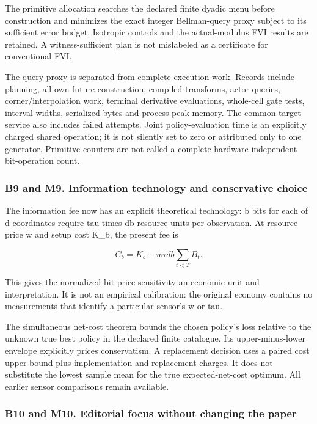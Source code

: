 \documentclass[ecta,nameyear,draft]{econsocart}
\begin{document}
The primitive allocation searches the declared finite dyadic menu before
construction and minimizes the exact integer Bellman-query proxy subject
to its sufficient error budget. Isotropic controls and the
actual-modulus FVI results are retained. A witness-sufficient plan is
not mislabeled as a certificate for conventional FVI.

The query proxy is separated from complete execution work. Records
include planning, all own-future construction, compiled transforms,
actor queries, corner/interpolation work, terminal derivative
evaluations, whole-cell gate tests, interval widths, serialized bytes
and process peak memory. The common-target service also includes failed
attempts. Joint policy-evaluation time is an explicitly charged shared
operation; it is not silently set to zero or attributed only to one
generator. Primitive counters are not called a complete
hardware-independent bit-operation count.

\hypertarget{b9-and-m9.-information-technology-and-conservative-choice}{%
\subsubsection{B9 and M9. Information technology and conservative
choice}\label{b9-and-m9.-information-technology-and-conservative-choice}}

The information fee now has an explicit theoretical technology: b bits
for each of d coordinates require tau times db resource units per
observation. At resource price w and setup cost K\_b, the present fee is

\[
 C_b=K_b+w\tau db\sum_{t<T}B_t.
\]

This gives the normalized bit-price sensitivity an economic unit and
interpretation. It is not an empirical calibration: the original economy
contains no measurements that identify a particular sensor's w or tau.

The simultaneous net-cost theorem bounds the chosen policy's loss
relative to the unknown true best policy in the declared finite
catalogue. Its upper-minus-lower envelope explicitly prices
conservatism. A replacement decision uses a paired cost upper bound plus
implementation and replacement charges. It does not substitute the
lowest sample mean for the true expected-net-cost optimum. All earlier
sensor comparisons remain available.

\hypertarget{b10-and-m10.-editorial-focus-without-changing-the-paper}{%
\subsubsection{B10 and M10. Editorial focus without changing the
paper}\label{b10-and-m10.-editorial-focus-without-changing-the-paper}}
\end{document}
